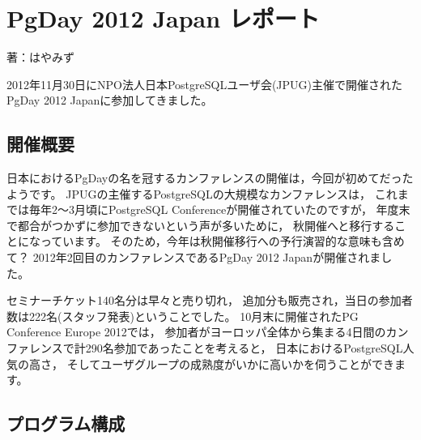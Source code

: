 
\chapter{PgDay 2012 Japan レポート}

\begin{flushright}
 {\headfont 著：はやみず}
\end{flushright}

2012年11月30日にNPO法人日本PostgreSQLユーザ会(JPUG)主催で開催されたPgDay 2012 Japanに参加してきました。

\section{開催概要}

日本におけるPgDayの名を冠するカンファレンスの開催は，今回が初めてだったようです。
JPUGの主催するPostgreSQLの大規模なカンファレンスは，
これまでは毎年2〜3月頃にPostgreSQL Conferenceが開催されていたのですが，
年度末で都合がつかずに参加できないという声が多いために，
秋開催へと移行することになっています。
そのため，今年は秋開催移行への予行演習的な意味も含めて？
2012年2回目のカンファレンスであるPgDay 2012 Japanが開催されました。

セミナーチケット140名分は早々と売り切れ，
追加分も販売され，当日の参加者数は222名(スタッフ発表)ということでした。
10月末に開催されたPG Conference Europe 2012では，
参加者がヨーロッパ全体から集まる4日間のカンファレンスで計290名参加であったことを考えると，
日本におけるPostgreSQL人気の高さ，
そしてユーザグループの成熟度がいかに高いかを伺うことができます。

\section{プログラム構成}

